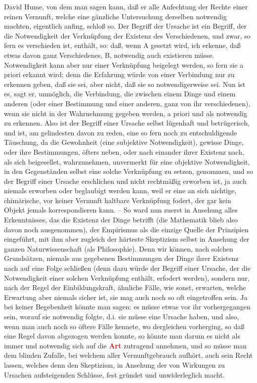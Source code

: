 \documentclass[a4paper,12pt,twoside]{book}
\newcommand{\match}[1]{\textcolor{red}{\textbf{#1}}}
\begin{document}
	David Hume, von dem man sagen kann, daß er alle Anfechtung der Rechte einer reinen Vernunft, welche eine gänzliche Untersuchung derselben notwendig machten, eigentlich anfing, schloß so. Der Begriff der Ursache ist ein Begriff, der die Notwendigkeit der Verknüpfung der Existenz des Verschiedenen, und zwar, so fern es verschieden ist, enthält, so: daß, wenn A gesetzt wird, ich erkenne, daß etwas davon ganz Verschiedenes, B, notwendig auch existieren müsse. Notwendigkeit kann aber nur einer Verknüpfung beigelegt werden, so fern sie a priori erkannt wird; denn die Erfahrung würde von einer Verbindung nur zu erkennen geben, daß sie sei, aber nicht, daß sie so notwendigerweise sei. Nun ist es, sagt er, unmöglich, die Verbindung, die zwischen einem Dinge und einem anderen (oder einer Bestimmung und einer anderen, ganz von ihr verschiedenen), wenn sie nicht in der Wahrnehmung gegeben werden, a priori und als notwendig zu erkennen. Also ist der Begriff einer Ursache selbst lügenhaft und betrügerisch, und ist, am gelindesten davon zu reden, eine so fern noch zu entschuldigende Täuschung, da die Gewohnheit (eine subjektive Notwendigkeit), gewisse Dinge, oder ihre Bestimmungen, öfters neben, oder nach einander ihrer Existenz nach, als sich beigesellet, wahrzunehmen, unvermerkt für eine objektive Notwendigkeit, in den Gegenständen selbst eine solche Verknüpfung zu setzen, genommen, und so der Begriff einer Ursache erschlichen und nicht rechtmäßig erworben ist, ja auch niemals erworben oder beglaubigt werden kann, weil er eine an sich nichtige, chimärische, vor keiner Vernunft haltbare Verknüpfung fodert, der gar kein Objekt jemals korrespondieren kann. – So ward nun zuerst in Ansehung alles Erkenntnisses, das die Existenz der Dinge betrifft (die Mathematik blieb also davon noch ausgenommen), der Empirismus als die einzige Quelle der Prinzipien eingeführt, mit ihm aber zugleich der härteste Skeptizism selbst in Ansehung der ganzen Naturwissenschaft (als Philosophie). Denn wir können, nach solchen Grundsätzen, niemals aus gegebenen Bestimmungen der Dinge ihrer Existenz nach auf eine Folge schließen (denn dazu würde der Begriff einer Ursache, der die Notwendigkeit einer solchen Verknüpfung enthält, erfodert werden), sondern nur, nach der Regel der Einbildungskraft, ähnliche Fälle, wie sonst, erwarten, welche Erwartung aber niemals sicher ist, sie mag auch noch so oft eingetroffen sein. Ja bei keiner Begebenheit könnte man sagen: es müsse etwas vor ihr vorhergegangen sein, worauf sie notwendig folgte, d.i. sie müsse eine Ursache haben, und also, wenn man auch noch so öftere Fälle kennete, wo dergleichen vorherging, so daß eine Regel davon abgezogen werden konnte, so könnte man darum es nicht als immer und notwendig sich auf die \match{Art} zutragend annehmen, und so müsse man dem blinden Zufalle, bei welchem aller Vernunftgebrauch aufhört, auch sein Recht lassen, welches denn den Skeptizism, in Ansehung der von Wirkungen zu Ursachen aufsteigenden Schlüsse, fest gründet und unwiderleglich macht. 
	
\end{document}
